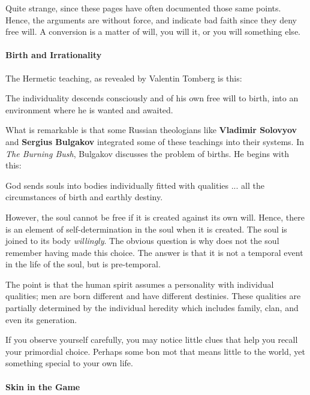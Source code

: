Quite strange, since these pages have often documented those same points. Hence, the arguments are without force, and indicate bad faith since they deny free will. A conversion is a matter of will, you will it, or you will something else.

\paragraph{Birth and Irrationality}


The Hermetic teaching, as revealed by Valentin Tomberg is this:

\begin{quotex}
The individuality descends consciously and of his own free will to birth, into an environment where he is wanted and awaited.
\end{quotex}


What is remarkable is that some Russian theologians like \textbf{Vladimir Solovyov} and \textbf{Sergius Bulgakov} integrated some of these teachings into their systems. In \emph{The Burning Bush}, Bulgakov discusses the problem of births. He begins with this:

\begin{quotex}
God sends souls into bodies individually fitted with qualities ... all the circumstances of birth and earthly destiny.
\end{quotex}


However, the soul cannot be free if it is created against its own will. Hence, there is an element of self-determination in the soul when it is created. The soul is joined to its body \emph{willingly}. The obvious question is why does not the soul remember having made this choice. The answer is that it is not a temporal event in the life of the soul, but is pre-temporal.

The point is that the human spirit assumes a personality with individual qualities; men are born different and have different destinies. These qualities are partially determined by the individual heredity which includes family, clan, and even its generation.

If you observe yourself carefully, you may notice little clues that help you recall your primordial choice. Perhaps some bon mot that means little to the world, yet something special to your own life.

\paragraph{Skin in the Game}


